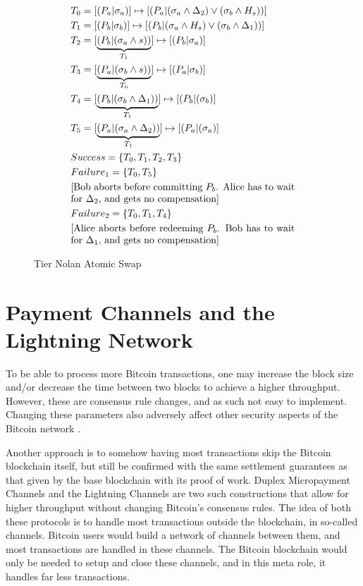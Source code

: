 \begin{figure}[!htb!]
    \centering
    \caption{Tier Nolan Atomic Swap}
    \label{fig:tier_nolan_atomic_swap}
\begin{align*}
    &T_0 = [(P_a|\sigma_a)] \mapsto [(P_a|(\sigma_a \land \Delta_2) \lor (\sigma_b \land H_{s}))] \\
    &T_1 = [(P_b|\sigma_b)] \mapsto [(P_b|(\sigma_a \land H_{s}) \lor (\sigma_b \land \Delta_1))] \\
    &T_2 = [\underbrace{(P_b|(\sigma_a \land s))}_{T_1}] \mapsto [(P_b|\sigma_a)]\\
    &T_3 = [\underbrace{(P_a|(\sigma_b \land s))}_{T_0}] \mapsto [(P_a|\sigma_b)]\\
    &T_4 = [\underbrace{(P_b|(\sigma_b \land \Delta_1))}_{T_1}] \mapsto [(P_b|(\sigma_b)] \\
    &T_5 = [\underbrace{(P_a|(\sigma_a \land \Delta_2))}_{T_1}] \mapsto [(P_a|(\sigma_a)] \\
    &Success = \{T_0, T_1, T_2, T_3\} \\
    &Failure_1 = \{T_0, T_5\} \\
    &\text{\parbox{8cm}{[Bob aborts before committing $P_b$. Alice has to wait for $\Delta_2$, and gets no compensation]}} \\
    &Failure_2 = \{T_0, T_1, T_4\} \\
    &\text{\parbox{8cm}{[Alice aborts before redeeming $P_b$. Bob has to wait for $\Delta_1$, and gets no compensation]}}
\end{align*}
\end{figure}

\section{Payment Channels and the Lightning Network}
To be able to process more Bitcoin transactions, one may increase the block size and/or decrease the time between two blocks to achieve a higher throughput. However, these are consensus rule changes, and as such not easy to implement. Changing these parameters also adversely affect other security aspects of the Bitcoin network \cite{gervais2016security}. 

Another approach is to somehow having most transactions skip the Bitcoin blockchain itself, but still be confirmed with the same settlement guarantees as that given by the base blockchain with its proof of work. Duplex Micropayment Channels \cite{decker_wattenhofer} and the Lightning Channels \cite{poon_dryja} are two such constructions that allow for higher throughput without changing Bitcoin's consensus rules. The idea of both these protocols is to handle most transactions outside the blockchain, in so-called channels. Bitcoin users would build a network of channels between them, and most transactions are handled in these channels. The Bitcoin blockchain would only be needed to setup and close these channels, and in this meta role, it handles far less transactions. 


